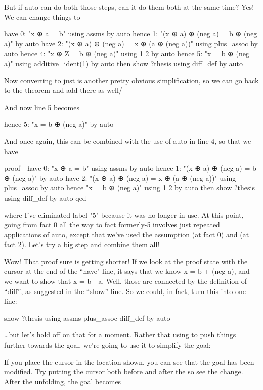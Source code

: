 But if auto can do both those steps, can it do them both at the same time? Yes! We can change things to 
\begin{IS}
  have 0: "x ⊕ a = b" using assms by auto
  hence 1: "(x ⊕ a) ⊕ (neg a) = b ⊕ (neg a)" by auto
  have 2: "(x ⊕ a) ⊕ (neg a) = x ⊕ (a ⊕ (neg a))" using plus_assoc by auto
  hence 4: "x ⊕ Z = b ⊕ (neg a)" using 1 2  by auto
  hence 5: "x = b ⊕ (neg a)" using additive_ident(1) by auto
  then show ?thesis using diff_def by auto
\end{IS}

Now converting  to just  is another pretty obvious simplification, so we can go back to the  theorem and add \isi{[simp]} there as well/

And now line 5 becomes
\begin{IS}    
hence 5: "x = b ⊕ (neg a)" by auto
\end{IS} 
And once again, this can be combined with the use of auto in line 4, so that we have
\begin{IS}
proof -
  have 0: "x ⊕ a = b" using assms by auto
  hence 1: "(x ⊕ a) ⊕ (neg a) = b ⊕ (neg a)" by auto
  have 2: "(x ⊕ a) ⊕ (neg a) = x ⊕ (a ⊕ (neg a))" using plus_assoc by auto
  hence "x = b ⊕ (neg a)" using 1 2 by auto
  then show ?thesis using diff_def by auto
qed
\end{IS} 
where I've eliminated label "5" because it was no longer in use. At this point, going from fact 0 all the way to fact formerly-5 involves just repeated applications of auto, except that we've used the assumption (at fact 0) and  (at fact 2). Let's try a big step and combine them all!

Wow! That proof sure is getting shorter! If we look at the proof state with the cursor at the end of the ``have" line, it says that we know x = b + (neg a), and we want to show that x = b - a. Well, those are connected by the definition of ``diff'', as suggested in the ``show'' line. So we could, in fact, turn this into one line:

\begin{IS}    
show ?thesis using  assms plus_assoc  diff_def by auto
\end{IS} 

\ldots but let's hold off on that for a moment. Rather that using  to push things further towards the goal, we're going to use it to simplify the goal:

If you place the cursor in the location shown, you can see that the goal has been modified. Try putting the cursor both before and after the  so see the change. After the unfolding, the goal becomes 

